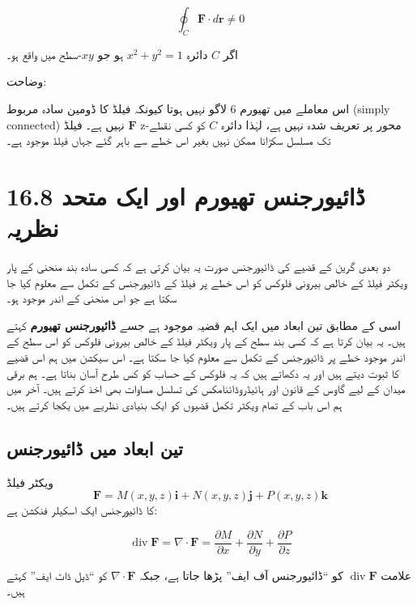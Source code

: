\begin{enumerate}
\[
\oint_C \mathbf{F} \cdot d\mathbf{r}
\neq 0
\]

اگر \( C \) دائرہ \( x^2 + y^2 = 1 \) ہو جو \( xy \)-سطح میں واقع ہو۔

\bigskip

وضاحت:

اس معاملے میں تھیورم 6 لاگو نہیں ہوتا کیونکہ فیلڈ کا ڈومین سادہ مربوط (simply connected) نہیں ہے۔ فیلڈ \( \mathbf{F} \) z-محور پر تعریف شدہ نہیں ہے، لہٰذا دائرہ \( C \) کو کسی نقطے تک مسلسل سکڑانا ممکن نہیں بغیر اس خطے سے باہر گئے جہاں فیلڈ موجود ہے۔



\section*{16.8 \quad ڈائیورجنس تھیورم اور ایک متحد نظریہ}

دو بعدی گرین کے قضیے کی ڈائیورجنس صورت یہ بیان کرتی ہے کہ کسی سادہ بند منحنی کے پار ویکٹر فیلڈ کے خالص بیرونی فلوکس کو اس خطے پر فیلڈ کے ڈائیورجنس کے تکمل سے معلوم کیا جا سکتا ہے جو اس منحنی کے اندر موجود ہو۔

اسی کے مطابق تین ابعاد میں ایک اہم قضیہ موجود ہے جسے \textbf{ڈائیورجنس تھیورم} کہتے ہیں۔ یہ بیان کرتا ہے کہ کسی بند سطح کے پار ویکٹر فیلڈ کے خالص بیرونی فلوکس کو اس سطح کے اندر موجود خطے پر ڈائیورجنس کے تکمل سے معلوم کیا جا سکتا ہے۔ اس سیکشن میں ہم اس قضیے کا ثبوت دیتے ہیں اور یہ دکھاتے ہیں کہ یہ فلوکس کے حساب کو کس طرح آسان بناتا ہے۔ ہم برقی میدان کے لیے گاوس کے قانون اور ہائیڈروڈائنامکس کی تسلسل مساوات بھی اخذ کرتے ہیں۔ آخر میں ہم اس باب کے تمام ویکٹر تکمل قضیوں کو ایک بنیادی نظریے میں یکجا کرتے ہیں۔

\bigskip

\subsection*{تین ابعاد میں ڈائیورجنس}

ویکٹر فیلڈ
\[
\mathbf{F} = M(x,y,z)\mathbf{i} + N(x,y,z)\mathbf{j} + P(x,y,z)\mathbf{k}
\]
کا ڈائیورجنس ایک اسکیلر فنکشن ہے:

\[
\operatorname{div}\mathbf{F} = \nabla \cdot \mathbf{F}
=
\frac{\partial M}{\partial x}
+
\frac{\partial N}{\partial y}
+
\frac{\partial P}{\partial z}
\tag{1}
\]

علامت \( \operatorname{div}\mathbf{F} \) کو “ڈائیورجنس آف ایف” پڑھا جاتا ہے، جبکہ \( \nabla \cdot \mathbf{F} \) کو “ڈیل ڈاٹ ایف” کہتے ہیں۔

\bigskip


\end{enumerate}
